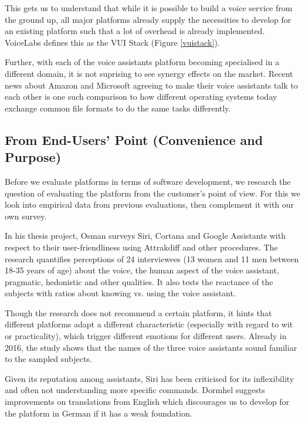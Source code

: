 This gets us to understand that while it is possible to build a voice service from the ground up, all major platforms already supply the necessities to develop for an existing platform such that a lot of overhead is already implemented. VoiceLabs defines this as the VUI Stack (Figure \ref{vuistack}).

Further, with each of the voice assistants platform becoming specialised in a different domain, %
it is not suprising to see synergy effects on the market. Recent news about
Amazon and Microsoft agreeing to make their voice assistants talk to each other \cite{amznMicrosoft} is one such comparison to how different operating systems today exchange common file formats to do the same tasks differently.\\


\subsection*{From End-Users' Point (Convenience and Purpose)}

Before we evaluate platforms in terms of software development, we research the question of evaluating the platform from the customer's point of view. For this we look into empirical data from previous evaluations, then complement it with our own survey. 

In his thesis project, Osman \cite{osman:siri} surveys Siri, Cortana and Google Assistants with respect to their user-friendliness using Attrakdiff and other procedures. The research quantifies perceptions of 24 interviewees (13 women and 11 men between 18-35 years of age) about the voice,  the human aspect of the voice assistant, pragmatic, hedonistic and other qualities. It also tests the reactance of the subjects with ratios about knowing vs. using the voice assistant.

Though the research does not recommend a certain platform, it hints that different platforms adapt a different characteristic (especially with regard to wit or practicality), which trigger different emotions for different users. Already in 2016, the study shows that the names of the three voice assistants sound familiar to the sampled subjects.

Given its reputation among assistants, Siri has been criticised for its inflexibility and often not understanding more specific commands. Dormhel suggests improvements on translations from English \cite{dormhell:siri} which discourages us to develop for the platform in German if it has a weak foundation.

